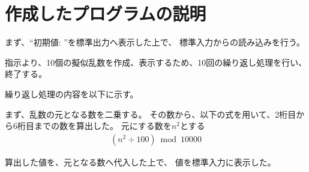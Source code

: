 

\section{作成したプログラムの説明}
まず、``初期値: ''を標準出力へ表示した上で、
標準入力からの読み込みを行う。

指示より、10個の擬似乱数を作成、表示するため、10回の繰り返し処理を行い、終了する。

繰り返し処理の内容を以下に示す。

まず、乱数の元となる数を二乗する。
その数から、以下の式を用いて、2桁目から6桁目までの数を算出した。
元にする数を$n^2$とする
\begin{align*}
    (n^2 \div 100) \bmod 10000
\end{align*}

算出した値を、元となる数へ代入した上で、
値を標準入力に表示した。



